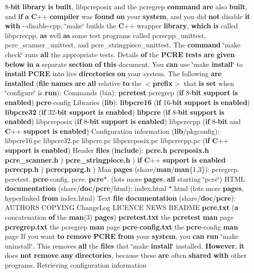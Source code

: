 8-\/{\bf bit} {\bf library} {\bf is} {\bf built}, libpcreposix and the pcregrep {\bf command} {\bf are} also {\bf built}, and {\bf if} {\bf a} {\bf C}++ {\bf compiler} was {\bf found} {\bf on} your {\bf system}, and you did {\bf not} disable {\bf it} {\bf with} -\/-\/disable-\/cpp, \char`\"{}make\char`\"{} builds the {\bf C}++ wrapper {\bf library}, {\bf which} {\bf is} called libpcrecpp, {\bf as} well {\bf as} some test programs called pcrecpp\+\_\+unittest, pcre\+\_\+scanner\+\_\+unittest, and pcre\+\_\+stringpiece\+\_\+unittest. The {\bf command} \char`\"{}make check\char`\"{} runs {\bf all} the appropriate tests. Details {\bf of} the {\bf P\+C\+RE} {\bf tests} {\bf are} {\bf given} {\bf below} {\bf in} {\bf a} separate {\bf section} {\bf of} {\bf this} document. You {\bf can} use \char`\"{}make {\bf install}\char`\"{} to {\bf install} {\bf P\+C\+RE} into live {\bf directories} {\bf on} your system. The following {\bf are} {\bf installed} ({\bf file} {\bf names} {\bf are} {\bf all} relative {\bf to} the $<${\bf prefix}$>$ that {\bf is} {\bf set} when \char`\"{}configure\char`\"{} is {\bf run})\+: Commands (bin)\+: {\bf pcretest} pcregrep ({\bf if} 8-\/{\bf bit} {\bf support} {\bf is} {\bf enabled}) {\bf pcre}-\/config Libraries ({\bf lib})\+: {\bf libpcre16} ({\bf if} 16-\/{\bf bit} {\bf support} {\bf is} {\bf enabled}) {\bf libpcre32} ({\bf if} 32-\/{\bf bit} {\bf support} {\bf is} {\bf enabled}) {\bf libpcre} ({\bf if} 8-\/{\bf bit} {\bf support} {\bf is} {\bf enabled}) libpcreposix ({\bf if} 8-\/{\bf bit} {\bf support} {\bf is} {\bf enabled}) libpcrecpp ({\bf if} 8-\/{\bf bit} and {\bf C}++ {\bf support} {\bf is} {\bf enabled}) Configuration information ({\bf lib}/pkgconfig)\+: libpcre16.\+pc libpcre32.\+pc libpcre.\+pc libpcreposix.\+pc libpcrecpp.\+pc ({\bf if} {\bf C}++ {\bf support} {\bf is} {\bf enabled}) Header {\bf files} ({\bf include})\+: {\bf pcre.\+h} {\bf pcreposix.\+h} {\bf pcre\+\_\+scanner.\+h} ) {\bf pcre\+\_\+stringpiece.\+h} ) {\bf if} {\bf C}++ {\bf support} {\bf is} {\bf enabled} {\bf pcrecpp.\+h} ) {\bf pcrecpparg.\+h} ) Man {\bf pages} (share/{\bf man}/{\bf man}\{1,3\})\+: pcregrep. pcretest. {\bf pcre}-\/config. pcre. {\bf pcre}$\ast$. (lots more {\bf pages}, {\bf all} starting \char`\"{}pcre\char`\"{}) H\+T\+ML {\bf documentation} (share/{\bf doc}/{\bf pcre}/html)\+: index.\+html $\ast$.html (lots more {\bf pages}, hyperlinked {\bf from} index.\+html) Text {\bf file} {\bf documentation} (share/{\bf doc}/{\bf pcre})\+: A\+U\+T\+H\+O\+RS C\+O\+P\+Y\+I\+NG Change\+Log L\+I\+C\+E\+N\+CE N\+E\+WS R\+E\+A\+D\+ME {\bf pcre.\+txt} ({\bf a} concatenation {\bf of} the {\bf man}(3) {\bf pages}) {\bf pcretest.\+txt} the {\bf pcretest} {\bf man} page {\bf pcregrep.\+txt} the pcregrep {\bf man} page {\bf pcre}-\/{\bf config.\+txt} the {\bf pcre}-\/config {\bf man} page If you want {\bf to} {\bf remove} {\bf P\+C\+RE} {\bf from} your {\bf system}, you {\bf can} {\bf run} \char`\"{}make uninstall\char`\"{}. This removes {\bf all} the {\bf files} that \char`\"{}make {\bf install}\char`\"{} installed. {\bf However}, {\bf it} does {\bf not} {\bf remove} {\bf any} {\bf directories}, because these {\bf are} often {\bf shared} {\bf with} other programs. Retrieving configuration information 